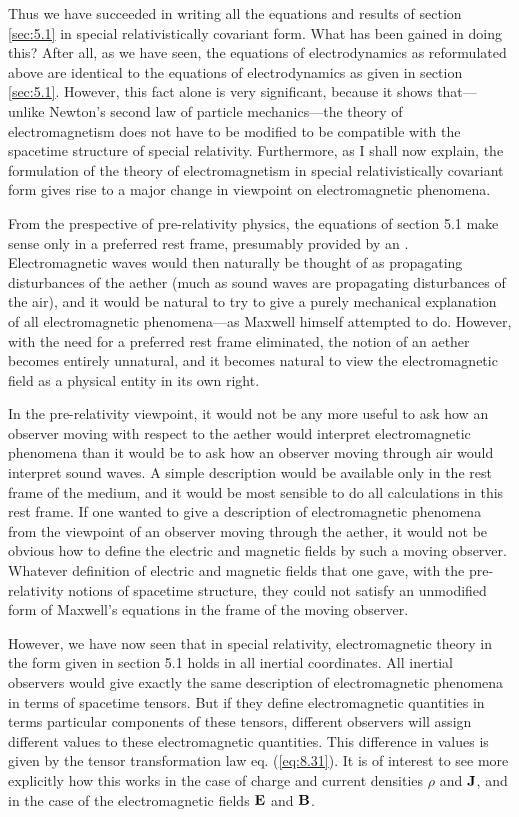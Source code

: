 Thus we have succeeded in writing all the equations and results of section \ref{sec:5.1} in special relativistically covariant form. What has been gained in doing this? After all, as we have seen, the equations of electrodynamics as reformulated above are identical to the equations of electrodynamics as given in section \ref{sec:5.1}. However, this fact alone is very significant, because it shows that---unlike Newton's second law of particle mechanics---the theory of electromagnetism does not have to be modified to be compatible with the spacetime structure of special relativity. Furthermore, as I shall now explain, the formulation of the theory of electromagnetism in special relativistically covariant form gives rise to a major change in viewpoint on electromagnetic phenomena. 

From the prespective of pre-relativity physics, the equations of section 5.1 make sense only in a preferred rest frame, presumably provided by an . Electromagnetic waves would then naturally be thought of as propagating disturbances of the aether (much as sound waves are propagating disturbances of the air), and it would be natural to try to give a purely mechanical explanation of all electromagnetic phenomena---as Maxwell himself attempted to do. However, with the need for a preferred rest frame eliminated, the notion of an aether becomes entirely unnatural, and it becomes natural to view the electromagnetic field as a physical entity in its own right.

In the pre-relativity viewpoint, it would not be any more useful to ask how an observer moving with respect to the aether would interpret electromagnetic phenomena than it would be to ask how an observer moving through air would interpret sound waves. A simple description would be available only in the rest frame of the medium, and it would be most sensible to do all calculations in this rest frame. If one wanted to give a description of electromagnetic phenomena from the viewpoint of an observer moving through the aether, it would not be obvious how to define the electric and magnetic fields  by such a moving observer. Whatever definition of electric and magnetic fields that one gave, with the pre-relativity notions of spacetime structure, they could not satisfy an unmodified form of Maxwell's equations in the frame of the moving observer. 

However, we have now seen that in special relativity, electromagnetic theory in the form given in section 5.1 holds in all inertial coordinates. All inertial observers would give exactly the same description of electromagnetic phenomena in terms of spacetime tensors. But if they define electromagnetic quantities in terms particular components of these tensors, different observers will assign different values to these electromagnetic quantities. This difference in values is given by the tensor transformation law eq. (\ref{eq:8.31}). It is of interest to see more explicitly how this works in the case of charge and current densities $\rho$ and $\vb{J}$, and in the case of the electromagnetic fields $\vb{E}$ and $\vb{B}$. 

